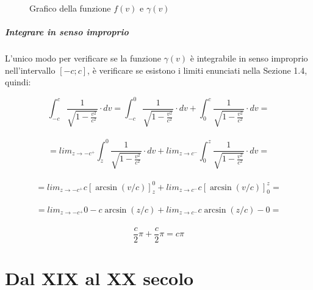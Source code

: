 \documentclass[a4paper,12pt]{report}
\begin{document}
\begin{figure}[!h]
\begin{center}
	\caption{Grafico della funzione $f(v)$ e $\gamma(v)$}
\end{center}
\end{figure}

\paragraph{Integrare in senso improprio}
L'unico modo per verificare se la funzione $\gamma(v)$ è integrabile in senso improprio nell'intervallo $[-c;c]$, è verificare se esistono i limiti enunciati nella Sezione 1.4, quindi:
\begin{center}
\[\int_{-c}^{c}\frac{1}{\sqrt{1- \frac{v^2}{c^2}}} \cdot dv = \int_{-c}^{0}\frac{1}{\sqrt{1- \frac{v^2}{c^2}}} \cdot dv + \int_{0}^{c}\frac{1}{\sqrt{1- \frac{v^2}{c^2}}} \cdot dv =\] \\
\[= lim_{z \to -c^+}\int_{z}^{0}\frac{1}{\sqrt{1- \frac{v^2}{c^2}}} \cdot dv + lim_{z \to c^-}\int_{0}^{z}\frac{1}{\sqrt{1- \frac{v^2}{c^2}}} \cdot dv =\]\\
\[= lim_{z \to -c^+}c[\arcsin(v/c)]_{z}^{0} + lim_{z \to c^-}c[\arcsin(v/c)]_{0}^{z} =\]\\
\[= lim_{z \to -c^+}0 - c\arcsin(z/c) + lim_{z \to c^-}c\arcsin(z/c) - 0 =\] \\
\[\frac{c}{2}\pi + \frac{c}{2}\pi = c\pi\]
\end{center}


\chapter{Dal XIX al XX secolo}
\end{document}
